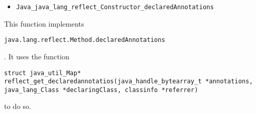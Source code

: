 \documentclass[a4paper, 10pt, titlepage]{scrartcl} %
\begin{document}
\begin{itemize}
 \item \begin{scriptsize}\verb|Java_java_lang_reflect_Constructor_declaredAnnotations|\end{scriptsize}
\end{itemize}
This function implements
\begin{scriptsize}\verb|java|\hspace{0.0pt}\verb|.|\hspace{0.0pt}\verb|lang|\hspace{0.0pt}\verb|.|\hspace{0.0pt}\verb|reflect|\hspace{0.0pt}\verb|.|\hspace{0.0pt}\verb|Method|\hspace{0.0pt}\verb|.|\hspace{0.0pt}\verb|declaredAnnotations|\end{scriptsize}. It uses the
function \begin{scriptsize}\verb|struct|\hspace{0.0pt}\verb| |\hspace{0.0pt}\verb|java_util_Map|\hspace{0.0pt}\verb|*|\hspace{0.0pt}\verb||\hspace{0.0pt}\verb| |\hspace{0.0pt}\verb|reflect_get_declaredannotatios|\hspace{0.0pt}\verb|(|\hspace{0.0pt}\verb|java_handle_bytearray_t|\hspace{0.0pt}\verb| |\hspace{0.0pt}\verb||\hspace{0.0pt}\verb|*|\hspace{0.0pt}\verb|annotations|\hspace{0.0pt}\verb|,|\hspace{0.0pt}\verb||\hspace{0.0pt}\verb| |\hspace{0.0pt}\verb|java_lang_Class|\hspace{0.0pt}\verb| |\hspace{0.0pt}\verb||\hspace{0.0pt}\verb|*|\hspace{0.0pt}\verb|declaringClass|\hspace{0.0pt}\verb|,|\hspace{0.0pt}\verb||\hspace{0.0pt}\verb| |\hspace{0.0pt}\verb|classinfo|\hspace{0.0pt}\verb| |\hspace{0.0pt}\verb||\hspace{0.0pt}\verb|*|\hspace{0.0pt}\verb|referrer|\hspace{0.0pt}\verb|)|\hspace{0.0pt}\verb||\end{scriptsize} to do so.
\end{document}
